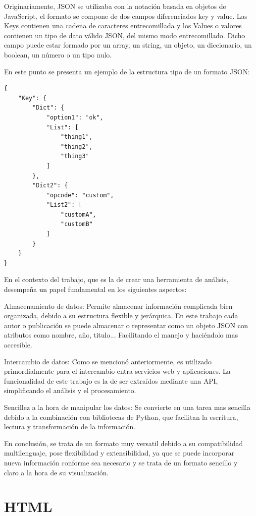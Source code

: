 \documentclass[a4paper, 12pt]{book}
\begin{document}
Originariamente, JSON se utilizaba con la notación basada en objetos de JavaScript, el formato se compone de dos campos diferenciados key y value.
Las Keys contienen una cadena de caracteres entrecomillada y los Values o valores contienen un tipo de dato válido JSON, del mismo modo entrecomillado. Dicho campo puede estar formado por un array, un string, un objeto, un diccionario, un boolean, un número o un tipo nulo.

En este punto se presenta un ejemplo de la estructura tipo de un formato JSON:

\begin{lstlisting}
{
    "Key": {
        "Dict": {
            "option1": "ok",
            "List": [
                "thing1",
                "thing2",
                "thing3"
            ]
        },
        "Dict2": {
            "opcode": "custom",
            "List2": [
                "customA",
                "customB"
            ]
        }
    }
}
\end{lstlisting}

En el contexto del trabajo, que es la de crear una herramienta de análisis, desempeña un papel fundamental en los siguientes aspectos:

Almacenamiento de datos: Permite almacenar información complicada bien organizada, debido a su estructura flexible y jerárquica. En este trabajo cada autor o publicación se puede almacenar o representar como un objeto JSON con atributos como nombre, año, titulo... Facilitando el manejo y haciéndolo mas accesible.

Intercambio de datos: Como se mencionó anteriormente, es utilizado primordialmente para el intercambio entra servicios web y aplicaciones. La funcionalidad de este trabajo es la de ser extraídos mediante una API, simplificando el análisis y el procesamiento.

Sencillez a la hora de manipular los datos: Se convierte en una tarea mas sencilla debido a la combinación con bibliotecas de Python, que facilitan la escritura, lectura y transformación de la información. 

En conclusión, se trata de un formato muy versatil debido a su compatibilidad multilenguaje, pose flexibilidad y extensibilidad, ya que se puede incorporar nueva información conforme sea necesario y se trata de un formato sencillo y claro a la hora de su visualización.


\section{HTML}
\end{document}
